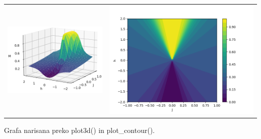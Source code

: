 \documentclass{article}
\begin{document}
\begin{tabular}{c c}
     \includegraphics[width = .5 \linewidth]{STFIM2.png}
     &  
     \includegraphics[width = .5 \linewidth]{STFIM3.png}\\
\end{tabular}
Grafa narisana preko plot3d() in plot\_contour().
\end{document}
